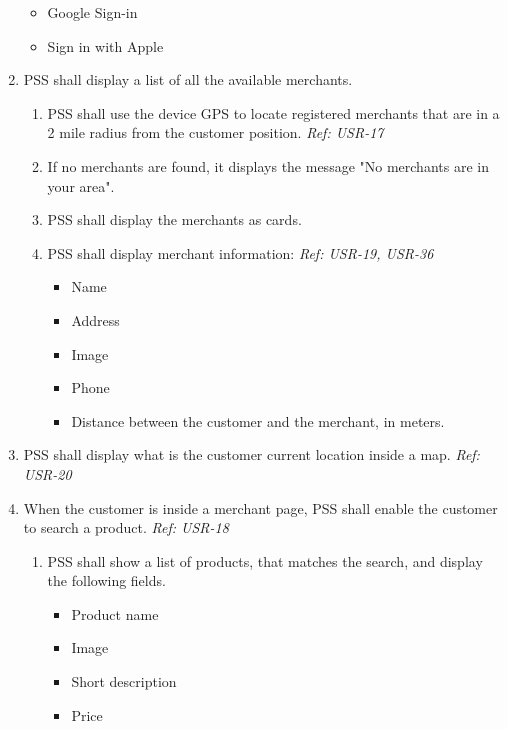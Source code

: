 \begin{enumerate}[resume, label=SY-\arabic*]
    \begin{itemize}
        \item Google Sign-in \cite{google-sign-in}
        \item Sign in with Apple \cite{sign-in-with-apple}
    \end{itemize}
    \pagebreak
    \item PSS shall display a list of all the available merchants.
    \begin{enumerate}[label=SY-9.\arabic*]
        \item PSS shall use the device GPS to locate registered merchants that 
        are in a 2 mile radius from the customer position.
        \newline \textit{Ref: USR-17}
        \item If no merchants are found, it displays the message "No merchants 
        are in your area".
        \item PSS shall display the merchants as 
        cards. \cite{material-design-cards}
        \item PSS shall display merchant information: 
        \newline \textit{Ref: USR-19, USR-36}
        \begin{itemize}
            \item Name
            \item Address
            \item Image
            \item Phone
            \item Distance between the customer and the merchant, in meters.
        \end{itemize}
    \end{enumerate}
    \item PSS shall display what is the customer current location 
    inside a map.
    \newline \textit{Ref: USR-20}
    \item When the customer is inside a merchant page, PSS shall enable the 
    customer to search a product.
    \newline \textit{Ref: USR-18}
    \begin{enumerate}[label=SY-11.\arabic*]
        \item PSS shall show a list of products, that matches the search, 
        and display the following fields.
        \begin{itemize}
            \item Product name
            \item Image 
            \item Short description
            \item Price
        \end{itemize}
    \end{enumerate}
    \end{enumerate}
